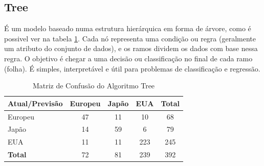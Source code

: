 \documentclass[conference]{IEEEtran}
\begin{document}
\subsection{Tree}
É um modelo baseado numa estrutura hierárquica em forma de árvore, como é possivel ver na tabela \ref{tab:conf_matrix_tree}.
Cada nó representa uma condição ou regra (geralmente um atributo do conjunto de dados), e os ramos dividem os dados com base
nessa regra. O objetivo é chegar a uma decisão ou classificação no final de cada ramo (folha). É simples, interpretável e
útil para problemas de classificação e regressão.
\begin{table}[!ht]
	\centering
	\begin{tabular}{lcccc}
		\toprule
		\textbf{Atual/Previsão} & \textbf{Europeu} & \textbf{Japão} & \textbf{EUA} & \textbf{Total} \\
		\midrule
		Europeu                 & 47               & 11             & 10           & 68             \\
		Japão                   & 14               & 59             & 6            & 79             \\
		EUA                     & 11               & 11             & 223          & 245            \\
		\midrule
		\textbf{Total}          & 72               & 81             & 239          & 392            \\
		\bottomrule
	\end{tabular}
	\caption{Matriz de Confusão do Algoritmo Tree}
	\label{tab:conf_matrix_tree}
	
\end{table}

\end{document}
